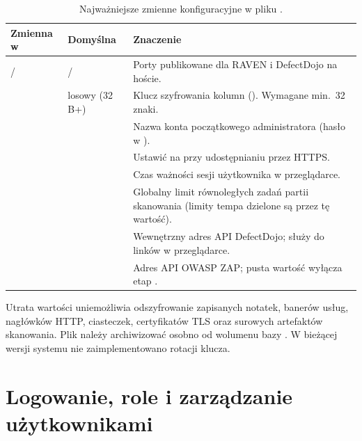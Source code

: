 \documentclass[10pt,a4paper]{article}
\begin{document}
\begin{table}[htbp]
  \centering
  \footnotesize
  \begin{tabularx}{\linewidth}{@{}L{47mm}L{29mm}Y@{}}
    \toprule
    \textbf{Zmienna w } & \textbf{Domyślna} & \textbf{Znaczenie} \\
    \midrule
     /  &  /  & Porty publikowane dla RAVEN i DefectDojo na hoście. \\
     & losowy (32\,B+) & Klucz szyfrowania kolumn  (). Wymagane min.\ 32 znaki. \\
     &  & Nazwa konta początkowego administratora (hasło w ). \\
     &  & Ustawić na  przy udostępnianiu przez HTTPS. \\
     &  & Czas ważności sesji użytkownika w przeglądarce. \\
     &  & Globalny limit równoległych zadań partii skanowania (limity tempa dzielone są przez tę wartość). \\
     &  & Wewnętrzny adres API DefectDojo;  służy do linków w przeglądarce. \\
     &  & Adres API OWASP ZAP; pusta wartość wyłącza etap . \\
    \bottomrule
  \end{tabularx}
  \caption{Najważniejsze zmienne konfiguracyjne w pliku .}
  \label{tab:env}
\end{table}

\begin{ostrzezenie}
  Utrata wartości  uniemożliwia odszyfrowanie zapisanych notatek, banerów usług, nagłówków HTTP, ciasteczek, certyfikatów TLS oraz surowych artefaktów skanowania. Plik  należy archiwizować osobno od wolumenu bazy . W bieżącej wersji systemu nie zaimplementowano rotacji klucza.
\end{ostrzezenie}

\section{Logowanie, role i zarządzanie użytkownikami}
\end{document}

